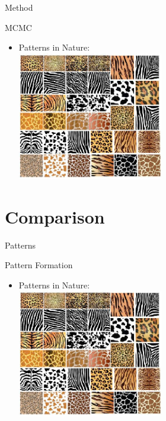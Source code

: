 \documentclass[t,10pt,fleqn]{beamer}
\begin{document}
\begin{frame}{Method}
\vspace{-.3cm}
\begin{block}{MCMC}
  \begin{itemize}
    \pause
    \item Patterns in Nature:
    \pause
    \\
    \includegraphics[width=0.5\textwidth]{creature_patterns2.png}
  \end{itemize}
\end{block}
\pause
\end{frame}
  
  
\section{Comparison}
\begin{frame}{Patterns}
\vspace{-.3cm}
\begin{block}{Pattern Formation}
  \begin{itemize}
    \pause
    \item Patterns in Nature:
    \pause
    \\
    \includegraphics[width=0.5\textwidth]{creature_patterns2.png}
  \end{itemize}
\end{block}
\pause
\end{frame}
\end{document}
